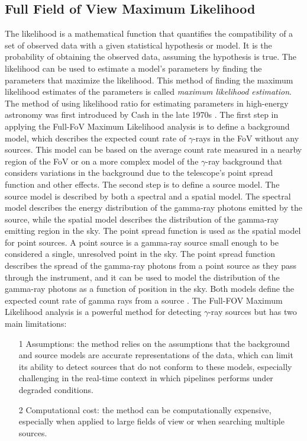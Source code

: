 \subsection{Full Field of View Maximum Likelihood}
\label{ss:ffov-ml}
The likelihood is a mathematical function that quantifies the compatibility of a set of observed data with a given statistical hypothesis or model. It is the probability of obtaining the observed data, assuming the hypothesis is true. The likelihood can be used to estimate a model's parameters by finding the parameters that maximize the likelihood. This method of finding the maximum likelihood estimates of the parameters is called \textit{maximum likelihood estimation}. The method of using likelihood ratio for estimating parameters in high-energy astronomy was first introduced by Cash in the late 1970s \cite{cash_1979}. The first step in applying the Full-FoV Maximum Likelihood analysis is to define a background model, which describes the expected count rate of $\gamma$-rays in the FoV without any sources. This model can be based on the average count rate measured in a nearby region of the FoV or on a more complex model of the $\gamma$-ray background that considers variations in the background due to the telescope's point spread function and other effects. The second step is to define a source model. The source model is described 
by both a spectral and a spatial model. The spectral model describes the energy distribution of the gamma-ray photons emitted by the source, while the spatial model describes the distribution of the gamma-ray emitting region in the sky. The point spread function is used as the spatial model for point sources. A point source is a gamma-ray source small enough to be considered a single, unresolved point in the sky. The point spread function describes the spread of the gamma-ray photons from a point source as they pass through the instrument, and it can be used to model the distribution of the gamma-ray photons as a function of position in the sky. Both models define the expected count rate of gamma rays from a source \cite{di2020detection}.  The Full-FOV Maximum Likelihood analysis is a powerful method for detecting $\gamma$-ray sources but has two main limitations:
\begin{itemize}
    \item[1] Assumptions: the method relies on the assumptions that the background and source models are accurate representations of the data, which can limit its ability to detect sources that do not conform to these models, especially challenging in the real-time context in which pipelines performs under degraded conditions.
    \item[2] Computational cost: the method can be computationally expensive, especially when applied to large fields of view or when searching multiple sources.
\end{itemize}

